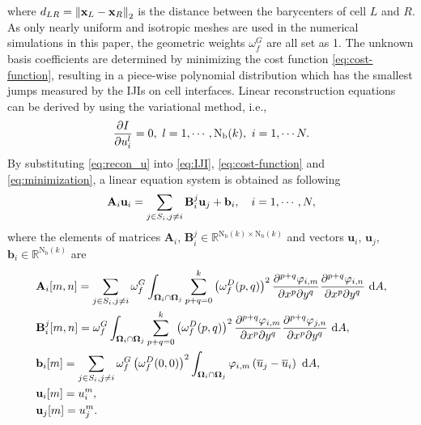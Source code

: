 where $d_{LR}= \left\| \mathbf{x}_L -\mathbf{x}_R \right\|_2$ is the distance between the barycenters of cell $L$ and $R$.
As only nearly uniform and isotropic meshes are used in the numerical simulations in this paper,
the geometric weights
$\omega^G_f$ are all set as 1.
The unknown basis coefficients are determined by minimizing the cost function \eqref{eq:cost-function}, resulting in a  piece-wise polynomial distribution which has the smallest jumps measured by the IJIs on cell interfaces.
Linear reconstruction equations can be derived by using the variational method, i.e.,
\begin{equation}
    \label{eq:minimization}
    \partialderivative{I}{u_i^l} = 0, \ l=1,\cdots, \mathrm{N_b}(k),\  i=1,\cdots N.
\end{equation}
By substituting \eqref{eq:recon_u} into \eqref{eq:IJI}, \eqref{eq:cost-function} and \eqref{eq:minimization}, a linear equation system is obtained as following
\begin{equation}
    \label{eq:vrBlockEq}
    \mathbf{A}_{i} \mathbf{u}_i
    =
    \sum_{j \in S_i, j \neq i} \mathbf{B}^j_{i} \mathbf{u}_j + \mathbf{b}_{i}, \quad i=1, \cdots, N,
\end{equation}
where the elements of matrices $\mathbf{A}_i$, $\mathbf{B}^j_i \in \mathbb{R}^{\mathrm{N_b}(k) \times \mathrm{N_b}(k)}$ and vectors $\mathbf{u}_i$, $\mathbf{u}_j$, $\mathbf{b}_i \in \mathbb{R}^{\mathrm{N_b}(k)}$ are
\begin{equation}
    \label{eq:vrCoeffs}
    \begin{aligned}
         & \mathbf{A}_{i} [m,n]=
        \sum_{j \in S_i, j \neq i} \omega_f^G\int_{\OO_i \cap \OO_j}{
            \sum_{p+q=0}^{k}
            \left(\omega_f^D(p,q)\right)^2
            \partialderivative{^{p+q}\varphi_{i,m}}{x^p\partial y^q}
            \partialderivative{^{p+q}\varphi_{i,n}}{x^p\partial y^q}
            \ \dd A},
        \\
         & \mathbf{B}^j_{i} [m,n]=
        \omega_f^G\int_{\OO_i \cap \OO_j}{
            \sum_{p+q=0}^{k}
            \left(\omega_f^D(p,q)\right)^2
            \partialderivative{^{p+q}\varphi_{i,m}}{x^p\partial y^q}
            \partialderivative{^{p+q}\varphi_{j,n}}{x^p\partial y^q}
            \ \dd A},
        \\
         & \mathbf{b}_{i} [m]=
        \sum_{j \in S_i, j \neq i}
        \omega_f^G \left(\omega_f^D(0,0)\right)^2
        \int_{\OO_i \cap \OO_j}{
            \varphi_{i,m} \left(\overline{u}_j - \overline{u}_i\right)
            \ \dd A},
        \\
         & \mathbf{u}_i [m]= u^m_i, \\
         & \mathbf{u}_j [m]= u^m_j.
    \end{aligned}
\end{equation}
